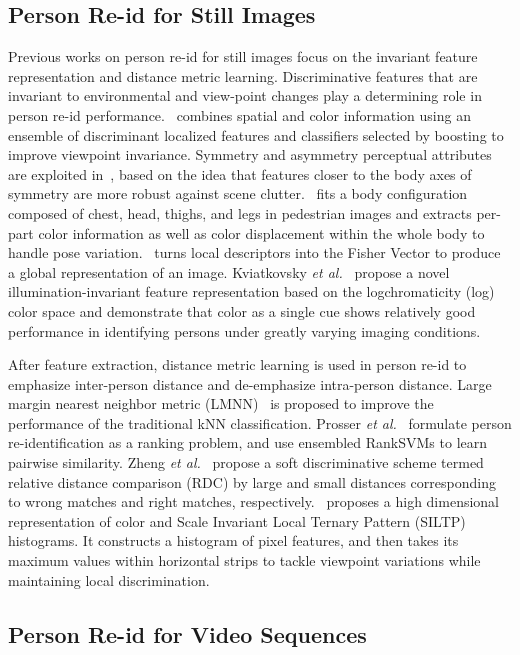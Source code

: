\documentclass[journal]{IEEEtran}
\begin{document}
\subsection{Person Re-id for Still Images}
Previous works on person re-id for still images focus on the invariant feature representation and distance metric learning. Discriminative features that are invariant to environmental and view-point changes play a determining  role in person re-id performance.~\cite{gray2008viewpoint} combines spatial and color information using an ensemble of discriminant localized features and classifiers selected by boosting to improve viewpoint invariance. Symmetry and asymmetry perceptual attributes are exploited in~\cite{farenzena2010person}, based on the idea that features closer to the body axes of symmetry are more robust against scene clutter.~\cite{cheng2011custom} fits a body configuration composed of chest, head, thighs, and legs in pedestrian images and extracts per-part color information as well as color displacement within the whole body to handle pose variation.~\cite{ma2012local} turns local descriptors into the Fisher Vector to produce a global representation of an image. Kviatkovsky \textit{et al.}~\cite{kviatkovsky2013color} propose a novel illumination-invariant feature representation based on the logchromaticity (log) color space and demonstrate that color as a single cue shows relatively good performance in identifying persons under greatly varying imaging conditions.

After feature extraction, distance metric learning is used in person re-id to emphasize inter-person distance and de-emphasize intra-person distance. Large margin nearest neighbor metric (LMNN)~\cite{weinberger2009distance} is proposed to improve the performance of the traditional kNN classification. Prosser \textit{et al.}~\cite{prosser2010person} formulate person re-identification as a ranking problem, and use ensembled RankSVMs to learn pairwise similarity. Zheng \textit{et al.}~\cite{zheng2013reidentification} propose a soft discriminative scheme termed relative distance comparison (RDC) by large and small distances corresponding to wrong matches and right matches, respectively.~\cite{liao2015person} proposes a high dimensional representation of color and Scale Invariant Local Ternary Pattern (SILTP) histograms. It constructs a histogram of pixel features, and then takes its maximum values within horizontal strips to tackle viewpoint variations while maintaining local discrimination.

\subsection{Person Re-id for Video Sequences}
\end{document}
